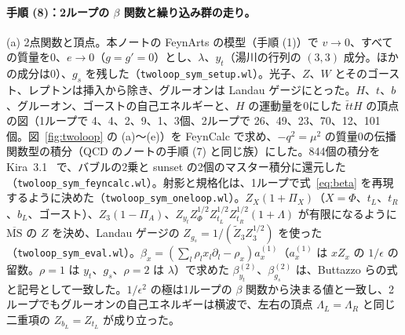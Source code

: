 \documentclass[a4paper,10pt]{ltjsarticle}
\newcommand{\MSbar}{\overline{\mathrm{MS}}}
\begin{document}
\paragraph{手順 (8)：2ループの $\beta$ 関数と繰り込み群の走り。}(a) 2点関数と頂点。本ノートの FeynArts の模型（手順 (1)）で $v\to0$、すべての質量を0、$e\to0$（$g=g'=0$）とし、$\lambda$、$y_t$（湯川の行列の $(3,3)$ 成分。ほかの成分は0）、$g_s$ を残した（\texttt{twoloop\_sym\_setup.wl}）。光子、$Z$、$W$ とそのゴースト、レプトンは挿入から除き、グルーオンは Landau ゲージにとった。$H$、$t$、$b$、グルーオン、ゴーストの自己エネルギーと、$H$ の運動量を0にした $\bar ttH$ の頂点の図（1ループで 4、4、2、9、1、3個、2ループで 26、49、23、70、12、101個。図~\ref{fig:twoloop} の (a)〜(e)）を FeynCalc で求め、$-q^2=\mu^2$ の質量0の伝播関数型の積分（QCD のノートの手順 (7) と同じ族）にした。844個の積分を Kira~3.1~\cite{kira3} で、バブルの2乗と sunset の2個のマスター積分に還元した（\texttt{twoloop\_sym\_feyncalc.wl}）。射影と規格化は、1ループで式~\eqref{eq:beta} を再現するように決めた（\texttt{twoloop\_sym\_oneloop.wl}）。$Z_X(1+\Pi_X)$（$X=\Phi$、$t_L$、$t_R$、$b_L$、ゴースト）、$Z_3(1-\Pi_A)$、$Z_{y_t}Z_\Phi^{1/2}Z_{t_L}^{1/2}Z_{t_R}^{1/2}(1+\Lambda)$ が有限になるように $\MSbar$ の $Z$ を決め、Landau ゲージの $Z_{g_s}=1/(\tilde Z_3Z_3^{1/2})$ を使った（\texttt{twoloop\_sym\_eval.wl}）。$\beta_x=(\sum_l\rho_lx_l\partial_l-\rho_x)a_x^{(1)}$（$a_x^{(1)}$ は $xZ_x$ の $1/\epsilon$ の留数。$\rho=1$ は $y_t$、$g_s$、$\rho=2$ は $\lambda$）で求めた $\beta^{(2)}_{y_t}$、$\beta^{(2)}_{g_s}$ は、Buttazzo らの式と記号として一致した。$1/\epsilon^2$ の極は1ループの $\beta$ 関数から決まる値と一致し、2ループでもグルーオンの自己エネルギーは横波で、左右の頂点 $\Lambda_L=\Lambda_R$ と同じ二重項の $Z_{b_L}=Z_{t_L}$ が成り立った。
\end{document}
